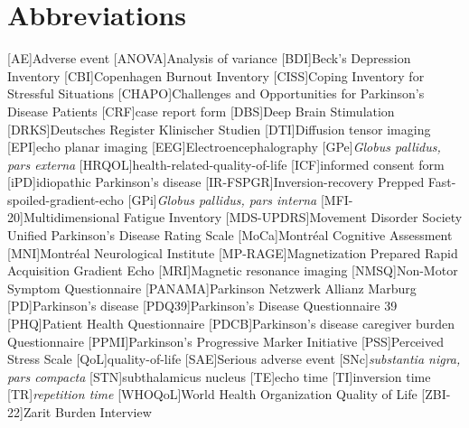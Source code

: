 \chapter*{Abbreviations}
\let\oldbaselinestretch=\baselinestretch%
\renewcommand{\baselinestretch}{1}%
\large\normalsize%
\thispagestyle{plain}
\begin{multicols}{2}
\begin{acronym}
\setlength{\parskip}{0ex}
[AE]{Adverse event}
[ANOVA]{Analysis of variance}
[BDI]{Beck's Depression Inventory}
[CBI]{Copenhagen Burnout Inventory}
[CISS]{Coping Inventory for Stressful Situations}
[CHAPO]{Challenges and Opportunities for Parkinson's Disease Patients}
[CRF]{case report form}
[DBS]{Deep Brain Stimulation}
[DRKS]{Deutsches Register Klinischer Studien}
[DTI]{Diffusion tensor imaging}
[EPI]{echo planar imaging}
[EEG]{Electroencephalography}
[GPe]{\textit{Globus pallidus, pars externa}}
[HRQOL]{health-related-quality-of-life}
[ICF]{informed consent form}
[iPD]{idiopathic Parkinson's disease}
[IR-FSPGR]{Inversion-recovery Prepped Fast-spoiled-gradient-echo}
[GPi]{\textit{Globus pallidus, pars interna}}
[MFI-20]{Multidimensional Fatigue Inventory}
[MDS-UPDRS]{Movement Disorder Society Unified Parkinson's Disease Rating Scale}
[MoCa]{Montréal Cognitive Assessment}
[MNI]{Montréal Neurological Institute}
[MP-RAGE]{Magnetization Prepared Rapid Acquisition Gradient Echo}
[MRI]{Magnetic resonance imaging}
[NMSQ]{Non-Motor Symptom Questionnaire}
[PANAMA]{Parkinson Netzwerk Allianz Marburg}
[PD]{Parkinson's disease}
[PDQ39]{Parkinson's Disease Questionnaire 39}
[PHQ]{Patient Health Questionnaire}
[PDCB]{Parkinson’s disease caregiver burden Questionnaire}
[PPMI]{Parkinson's Progressive Marker Initiative}
[PSS]{Perceived Stress Scale}
[QoL]{quality-of-life}
[SAE]{Serious adverse event}
[SNc]{\textit{substantia nigra, pars compacta}}
[STN]{subthalamicus nucleus}
[TE]{echo time}
[TI]{inversion time}
[TR]{\textit{repetition time}}
[WHOQoL]{World Health Organization Quality of Life}
[ZBI-22]{Zarit Burden Interview}
\end{acronym}
\renewcommand{\baselinestretch}{\oldbaselinestretch}%
\large\normalsize%
\end{multicols}

